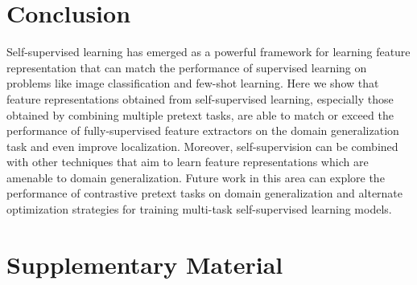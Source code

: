 \documentclass[runningheads]{llncs}
\begin{document}
\section{Conclusion}\vspace{-10pt}
Self-supervised learning has emerged as a powerful framework for learning feature representation that can match the performance of supervised learning on problems like image classification and few-shot learning. Here we show that feature representations obtained from self-supervised learning, especially those obtained by combining multiple pretext tasks, are able to match or exceed the performance of fully-supervised feature extractors on the domain generalization task and even improve localization. Moreover, self-supervision can be combined with other techniques that aim to learn feature representations which are amenable to domain generalization. Future work in this area can explore the performance of contrastive pretext tasks on domain generalization and alternate optimization strategies for training multi-task self-supervised learning models. 







\clearpage
\section*{Supplementary Material}
\end{document}
